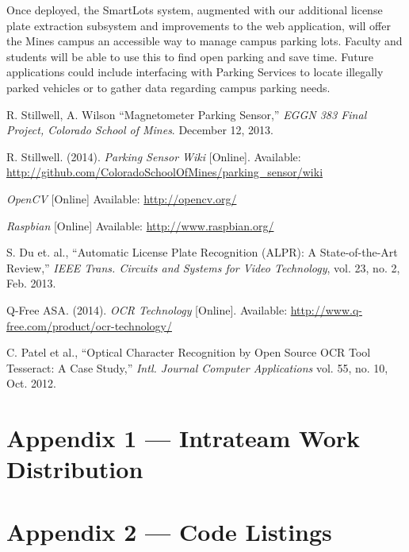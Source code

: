 \documentclass[11pt, oneside, fullpage, doublespace]{article}
\begin{document}
Once deployed, the SmartLots system, augmented with our additional license plate extraction subsystem and improvements to the web application, will offer the Mines campus an accessible way to manage campus parking lots. Faculty and students will be able to use this to find open parking and save time. Future applications could include interfacing with Parking Services to locate illegally parked vehicles or to gather data regarding campus parking needs.


\begin{thebibliography}{99}
 R. Stillwell, A. Wilson ``Magnetometer Parking Sensor,'' \emph{EGGN 383 Final Project, Colorado School of Mines}. December 12, 2013.

 R. Stillwell. (2014). \emph{Parking Sensor Wiki} [Online]. Available: \url{http://github.com/ColoradoSchoolOfMines/parking_sensor/wiki}

 \emph{OpenCV} [Online] Available: \url{http://opencv.org/}

 \emph{Raspbian} [Online] Available: \url{http://www.raspbian.org/}

 S. Du et. al., ``Automatic License Plate Recognition (ALPR): A State-of-the-Art Review,'' \emph{IEEE Trans. Circuits and Systems for Video Technology}, vol. 23, no. 2, Feb. 2013.

 Q-Free ASA. (2014). \emph{OCR Technology} [Online]. Available: \url{http://www.q-free.com/product/ocr-technology/}

 C. Patel et al., ``Optical Character Recognition by Open Source OCR Tool Tesseract: A Case Study,'' \emph{Intl. Journal Computer Applications} vol. 55, no. 10, Oct. 2012.

\end{thebibliography}


\section*{Appendix 1 --- Intrateam Work Distribution}


\section*{Appendix 2 --- Code Listings}
\end{document}

